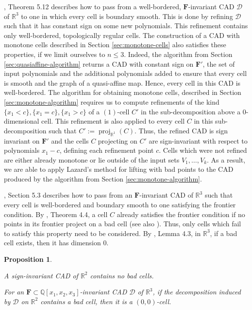 \documentclass[
]{book}
\newtheorem{proposition}{Proposition}[chapter]
\theoremstyle{definition}
\theoremstyle{definition}
\theoremstyle{definition}
\theoremstyle{definition}
\theoremstyle{remark}
\begin{document}
\citet{lazard10}, Theorem 5.12 describes how to pass from a well-bordered, \(\mathbf{F}\)-invariant CAD \(\mathcal{D}\) of \(\mathbb{R}^3\) to one in which every cell is boundary smooth. This is done by refining \(\mathcal{D}\) such that it has constant sign on some new polynomials. This refinement contains only well-bordered, topologically regular cells.
The construction of a CAD with monotone cells described in Section \ref{sec:monotone-cells} also satisfies these properties, if we limit ourselves to \(n\le3\). Indeed, the algorithm from Section \ref{sec:quasiaffine-algorithm} returns a CAD with constant sign on \(\mathbf{F'}\), the set of input polynomials and the additional polynomials added to ensure that every cell is smooth and the graph of a quasi-affine map. Hence, every cell in this CAD is well-bordered. The algorithm for obtaining monotone cells, described in Section \ref{sec:monotone-algorithm} requires us to compute refinements of the kind \(\{ x_1 < c \}, \{ x_1 = c \}, \{ x_1 > c \}\) of a \((1)\)-cell \(C'\) in the sub-decomposition above a 0-dimensional cell.
This refinement is also applied to every cell \(C\) in this sub-decomposition such that \(C' := {\operatorname{proj}_{\mathbb{R}^{1}}}(C)\). Thus, the refined CAD is sign invariant on \(\mathbf{F'}\) and the cells \(C\) projecting on \(C'\) are sign-invariant with respect to polynomials \(x_1 - c\), defining each refinement point \(c\).
Cells which were not refined are either already monotone or lie outside of the input sets \(V_1,\ldots,V_k\).
As a result, we are able to apply Lazard's method for lifting with bad points to the CAD produced by the algorithm from Section \ref{sec:monotone-algorithm}.

\citet{lazard10}, Section 5.3 describes how to pass from an \(\mathbf{F}\)-invariant CAD of \(\mathbb{R}^3\) such that every cell is well-bordered and boundary smooth to one satisfying the frontier condition.
By \citet{lazard10}, Theorem 4.4, a cell \(C\) already satisfies the frontier condition if no points in its frontier project on a bad cell (see also \citet{jhd20}).
Thus, only cells which fail to satisfy this property need to be considered. By \citet{lazard10}, Lemma 4.3, in \(\mathbb{R}^3\), if a bad cell exists, then it has dimension \(0\).

\begin{proposition}
\protect\hypertarget{prp:only-bad-zero-cells}{}\label{prp:only-bad-zero-cells}\citep[Lemma 4.3]{lazard10}

A sign-invariant CAD of \(\mathbb{R}^2\) contains no bad cells.

For an \(\mathbf{F} \subset \mathbb{Q}[x_1,x_2,x_3]\)-invariant CAD \(\mathcal{D}\) of \(\mathbb{R}^3\), if the decomposition induced by \(\mathcal{D}\) on \(\mathbb{R}^2\) contains a bad cell, then it is a \((0,0)\)-cell.
\end{proposition}
\end{document}
